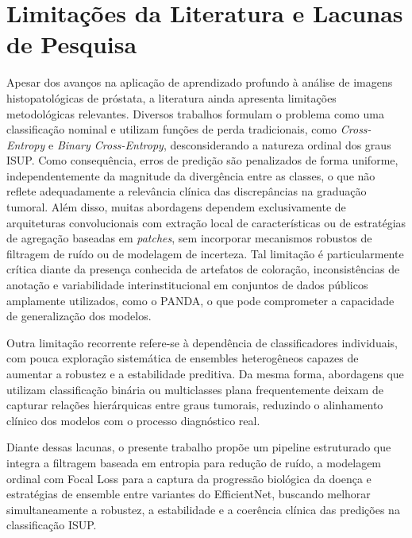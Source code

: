\section{Limitações da Literatura e Lacunas de Pesquisa}

Apesar dos avanços na aplicação de aprendizado profundo à análise de imagens histopatológicas de próstata, a literatura ainda apresenta limitações metodológicas relevantes. Diversos trabalhos formulam o problema como uma classificação nominal e utilizam funções de perda tradicionais, como \textit{Cross-Entropy} e \textit{Binary Cross-Entropy}, desconsiderando a natureza ordinal dos graus ISUP. Como consequência, erros de predição são penalizados de forma uniforme, independentemente da magnitude da divergência entre as classes, o que não reflete adequadamente a relevância clínica das discrepâncias na graduação tumoral. Além disso, muitas abordagens dependem exclusivamente de arquiteturas convolucionais com extração local de características ou de estratégias de agregação baseadas em \textit{patches}, sem incorporar mecanismos robustos de filtragem de ruído ou de modelagem de incerteza. Tal limitação é particularmente crítica diante da presença conhecida de artefatos de coloração, inconsistências de anotação e variabilidade interinstitucional em conjuntos de dados públicos amplamente utilizados, como o PANDA, o que pode comprometer a capacidade de generalização dos modelos.

Outra limitação recorrente refere-se à dependência de classificadores individuais, com pouca exploração sistemática de ensembles heterogêneos capazes de aumentar a robustez e a estabilidade preditiva. Da mesma forma, abordagens que utilizam classificação binária ou multiclasses plana frequentemente deixam de capturar relações hierárquicas entre graus tumorais, reduzindo o alinhamento clínico dos modelos com o processo diagnóstico real.

Diante dessas lacunas, o presente trabalho propõe um pipeline estruturado que integra a filtragem baseada em entropia para redução de ruído, a modelagem ordinal com Focal Loss para a captura da progressão biológica da doença e estratégias de ensemble entre variantes do EfficientNet, buscando melhorar simultaneamente a robustez, a estabilidade e a coerência clínica das predições na classificação ISUP.
